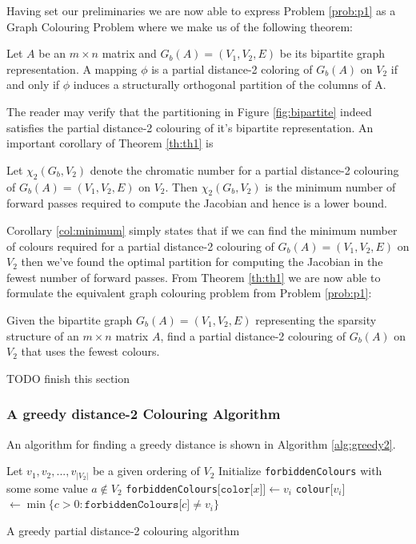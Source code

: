 	Having set our preliminaries we are now able to express Problem
	\ref{prob:p1} as a Graph Colouring Problem where  we make us of the following theorem:
	\begin{theorem}
		Let $A$ be an $m \times n$ matrix and $G_b(A) = (V_1, V_2, E)$ be its bipartite
		graph representation. A mapping $\phi$ is a partial distance-2 coloring of
		$G_b(A)$ on $V_2$ if and only if $\phi$ induces a structurally orthogonal
		partition of the columns of A. 
		\label{th:th1}
	\end{theorem}
	The reader may verify that the partitioning in Figure \ref{fig:bipartite} indeed
	satisfies the partial distance-2 colouring of 
	it's bipartite representation. An important corollary of Theorem \ref{th:th1} is
	
	\begin{corollary}
		Let $\chi_2(G_b, V_2)$ denote the chromatic number for a partial distance-2
		colouring of $G_b(A) = (V_1, V_2, E)$  on $V_2$. 
		Then $\chi_2(G_b, V_2)$ is the minimum number of forward passes required to
		compute the Jacobian and hence is a lower bound. 
		\label{col:minimum}
	\end{corollary}
	Corollary \ref{col:minimum} simply states that if we can find the minimum number
	of colours required for a partial distance-2 colouring of $G_b(A) = (V_1, V_2,
	E)$  on $V_2$  then we've found the optimal partition for computing the 
	Jacobian in the fewest number of forward passes. From Theorem \ref{th:th1} we
	are now able to formulate the equivalent graph colouring problem from Problem
	\ref{prob:p1}:
	\begin{problem}
		Given the bipartite graph $G_b(A) = (V_1, V_2, E)$ representing the sparsity
		structure of an $m \times n$ matrix $A$, find a partial distance-2 colouring of
		$G_b(A)$ on $V_2$ that uses the fewest colours. 
	\end{problem} 
	TODO finish this section
	
	\subsubsection{A greedy distance-2 Colouring Algorithm}
	An algorithm for finding a greedy distance is shown in Algorithm
	\ref{alg:greedy2}.\newline 
	\begin{algorithm}[H]
		\SetAlgoLined
		Let $v_1, v_2, ..., v_{\vert V_2 \vert}$ be a given ordering of $V_2$\;
		Initialize \texttt{forbiddenColours} with some some value $a \not\in V_2$\;
		{
			{
				{
					\texttt{forbiddenColours}$\lbrack \texttt{color} \lbrack x \rbrack \rbrack
					\leftarrow v_i$
				}
			}  
			\texttt{colour}$\lbrack v_i \rbrack$ $\leftarrow \min \{ c > 0 :
			\texttt{forbiddenColours}\lbrack c \rbrack \not= v_i \}$
		}	
		\caption{A greedy partial distance-2 colouring algorithm}
		\label{alg:greedy2}
	\end{algorithm}
	
